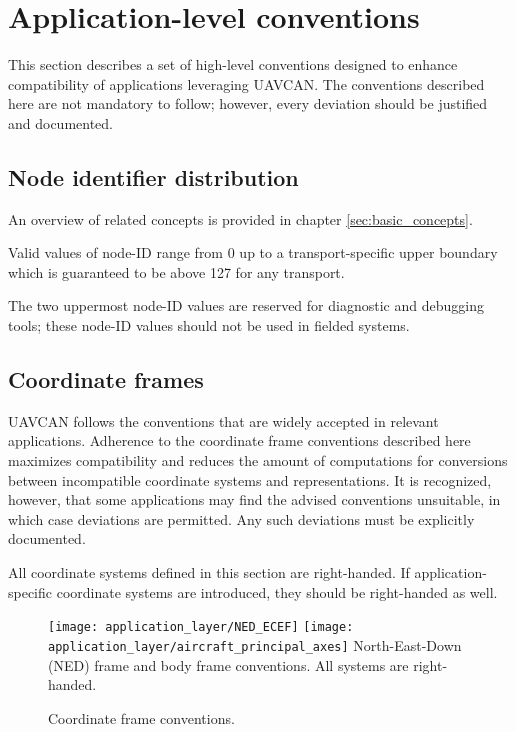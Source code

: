 \section{Application-level conventions}\label{sec:application_level_conventions}

This section describes a set of high-level conventions designed to enhance compatibility
of applications leveraging UAVCAN.
The conventions described here are not mandatory to follow;
however, every deviation should be justified and documented.

\subsection{Node identifier distribution}

An overview of related concepts is provided in chapter \ref{sec:basic_concepts}.

Valid values of node-ID range from 0 up to a transport-specific upper boundary
which is guaranteed to be above 127 for any transport.

The two uppermost node-ID values are reserved for diagnostic and debugging tools;
these node-ID values should not be used in fielded systems.

\subsection{Coordinate frames}

UAVCAN follows the conventions that are widely accepted in relevant applications.
Adherence to the coordinate frame conventions described here maximizes compatibility and
reduces the amount of computations for conversions between incompatible coordinate systems and
representations.
It is recognized, however, that some applications may find the advised conventions unsuitable,
in which case deviations are permitted.
Any such deviations must be explicitly documented.

All coordinate systems defined in this section are right-handed.
If application-specific coordinate systems are introduced, they should be right-handed as well.

\begin{figure}[hbt]
    \centering
	\texttt{[image: application\_layer/NED\_ECEF]}
    \texttt{[image: application\_layer/aircraft\_principal\_axes]}
    North-East-Down (NED) frame and body frame conventions. All systems are right-handed.
    \caption{
        Coordinate frame conventions.
        \label{fig:application_coordinate_frame_conventions}
    }
\end{figure}

